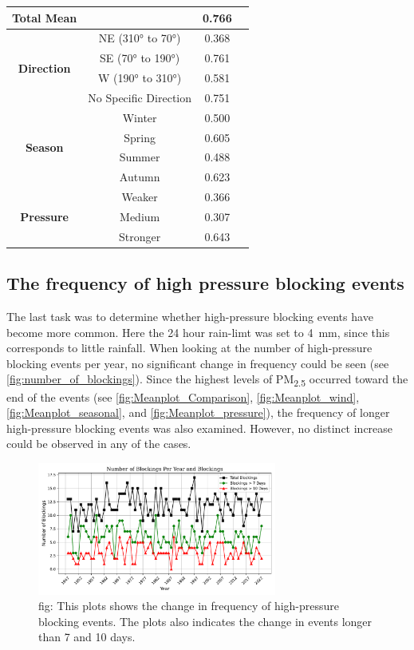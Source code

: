 \begin{table}[H]
\begin{minipage}{0.45\textwidth}
\begin{tabular}{@{}cccc@{}}
        \multirow{1}{*}{\textbf{Total Mean}} &  & 0.766 \\ \midrule    \multirow{4}{*}{\textbf{Direction}} & NE (310° to 70°)  & 0.368 \\  & SE (70° to 190°)  & 0.761 \\  & W (190° to 310°)  & 0.581 \\  & No Specific Direction  & 0.751 \\  \midrule   \multirow{4}{*}{\textbf{Season}} & Winter  & 0.500 \\  & Spring  & 0.605 \\  & Summer  & 0.488 \\  & Autumn  & 0.623 \\  \midrule    \multirow{4}{*}{\textbf{Pressure}} & Weaker  & 0.366 \\  & Medium  & 0.307 \\  & Stronger  & 0.643 \\ 
        \bottomrule
        \end{tabular}
    \end{minipage}
\end{table}


\subsection{The frequency of high pressure blocking events}
The last task was to determine whether high-pressure blocking events have become more common. Here the 24 hour rain-limt was set to \SI{4}{\mm}, since this corresponds to little rainfall. When looking at the number of high-pressure blocking events per year, no significant change in frequency could be seen (see \autoref{fig:number_of_blockings}). Since the highest levels of PM\textsubscript{2.5} occurred toward the end of the events (see \autoref{fig:Meanplot_Comparison}, \autoref{fig:Meanplot_wind}, \autoref{fig:Meanplot_seasonal}, and \autoref{fig:Meanplot_pressure}), the frequency of longer high-pressure blocking events was also examined. However, no distinct increase could be observed in any of the cases.

\begin{figure}[H]
    \centering
    \includegraphics[width=0.7\textwidth]{Figures/BlockingsPerYear.pdf}
    \caption{fig: This plots shows the change in frequency of high-pressure blocking events. The plots also indicates the change in events longer than 7 and 10 days. }
    \label{fig:number_of_blockings}
\end{figure}

